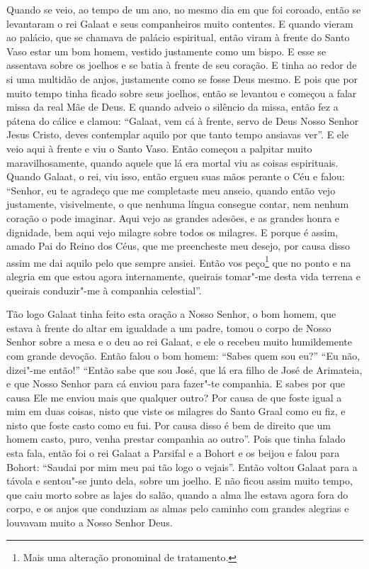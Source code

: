 Quando se veio, ao tempo de um ano, no mesmo dia em que foi coroado, então se
levantaram o rei Galaat e seus companheiros muito contentes. E quando vieram ao
palácio, que se chamava de palácio espiritual, então viram à frente do Santo
Vaso estar um bom homem, vestido justamente como um bispo. E esse se assentava
sobre os joelhos e se batia à frente de seu coração. E tinha ao redor de si uma
multidão de anjos, justamente como se fosse Deus mesmo. E pois que por muito
tempo tinha ficado sobre seus joelhos, então se levantou e começou a falar
missa da real Mãe de Deus. E quando adveio o silêncio da missa, então fez a
pátena do cálice e clamou: “Galaat, vem cá à frente, servo de Deus Nosso Senhor
Jesus Cristo, deves contemplar aquilo por que tanto tempo ansiavas ver”. E ele
veio aqui à frente e viu o Santo Vaso. Então começou a palpitar muito
maravilhosamente, quando aquele que lá era mortal viu as coisas espirituais.
Quando Galaat, o rei, viu isso, então ergueu suas mãos perante o Céu e falou:
“Senhor, eu te agradeço que me completaste meu anseio, quando então vejo
justamente, visivelmente, o que nenhuma língua consegue contar, nem nenhum
coração o pode imaginar. Aqui vejo as grandes adesões, e as grandes honra e
dignidade, bem aqui vejo milagre sobre todos os milagres. E porque é assim,
amado Pai do Reino dos Céus, que me preencheste meu desejo, por causa disso
assim me dai aquilo pelo que sempre ansiei. Então vos peço\footnote{ Mais uma
alteração pronominal de tratamento.} que no ponto e na alegria em
que estou agora internamente, queirais tomar"-me desta vida terrena e queirais
conduzir"-me à companhia celestial”.

Tão logo Galaat tinha feito esta oração a Nosso Senhor, o bom homem, que estava
à frente do altar em igualdade a um padre, tomou o corpo de Nosso Senhor sobre
a mesa e o deu ao rei Galaat, e ele o recebeu muito humildemente com grande
devoção. Então falou o bom homem: “Sabes quem sou eu?” “Eu não, dizei"-me
então!” “Então sabe que sou José, que lá era filho de José de Arimateia, e que
Nosso Senhor para cá enviou para fazer"-te companhia. E sabes por que causa Ele
me enviou mais que qualquer outro? Por causa de que foste igual a mim em duas
coisas, nisto que viste os milagres do Santo Graal como eu fiz, e nisto que
foste casto como eu fui. Por causa disso é bem de direito que um homem casto,
puro, venha prestar companhia ao outro”. Pois que tinha falado esta
fala, então foi o rei Galaat a Parsifal e a Bohort e os beijou e falou para
Bohort: “Saudai por mim meu pai tão logo o vejais”. Então voltou Galaat para a
távola e sentou"-se junto dela, sobre um joelho. E não ficou assim muito tempo,
que caiu morto sobre as lajes do salão, quando a alma lhe estava agora fora do
corpo, e os anjos que conduziam as almas pelo caminho com grandes alegrias e
louvavam muito a Nosso Senhor Deus.

